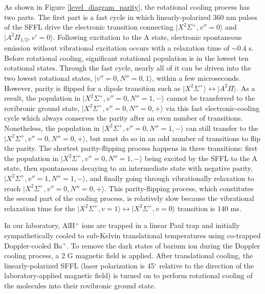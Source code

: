 \documentclass[nofootinbib,aip,jcp,reprint]{revtex4-1}
\begin{document}
As shown in Figure \ref{level_diagram_parity}, the rotational cooling process has two parts. The first part is a fast cycle in which linearly-polarized 360 nm pulses of the SFFL drive the electronic transition connecting $\lvert X^2\Sigma^+, v''=0\rangle$ and $\lvert A^{2}\Pi_{1/2}, v'=0\rangle$. Following excitation to the A state, electronic spontaneous emission without vibrational excitation occurs with a relaxation time of $\sim$0.4 {\micro}s.  Before rotational cooling, significant rotational population is in the lowest ten rotational states. Through the fast cycle, nearly all of it can be driven into the two lowest rotational states, $\lvert v''=0, N''=0,1\rangle$, within a few microseconds. However, parity is flipped for a dipole transition such as $\lvert X^2\Sigma^+\rangle \leftrightarrow \lvert A^2\Pi\rangle$. As a result, the population in $\lvert X^2\Sigma^+, v''=0, N''=1, -\rangle$ cannot be transferred to the rovibronic ground state, $\lvert X^2\Sigma^+, v''=0, N''=0, +\rangle$ via this fast electronic-cooling cycle which always conserves the parity after an even number of transitions. Nonetheless, the population in $\lvert X^2\Sigma^+, v''=0, N''=1, -\rangle$ can still transfer to the $\lvert X^2\Sigma^+, v''=0, N''=0, +\rangle$, but must do so in an odd number of transitions to flip the parity. The shortest parity-flipping process happens in three transitions: first the population in $\lvert X^2\Sigma^+, v''=0, N''=1, -\rangle$ being excited by the SFFL to the A state, then spontaneous decaying to an intermediate state with negative parity, $\lvert X^2\Sigma^+, v''=1, N''=1, -\rangle$, and finally going through vibrationally relaxation to reach $\lvert X^2\Sigma^+, v''=0, N''=0, +\rangle$. This parity-flipping process, which constitutes the second part of the cooling process, is relatively slow because the vibrational relaxation time for the $\lvert X^2\Sigma^+, v=1\rangle \leftrightarrow \lvert X^2\Sigma^+, v=0\rangle$ transition is 140 ms.\par

In our laboratory, AlH$^+$ ions are trapped in a linear Paul trap and initially sympathetically cooled to sub-Kelvin translational temperatures using co-trapped Doppler-cooled Ba$^+$. To remove the dark states of barium ion during the Doppler cooling process, a 2 G magnetic field is applied. After translational cooling, the linearly-polarized SFFL (laser polarization is 45$^{\circ}$ relative to the direction of the laboratory-applied magnetic field) is turned on to perform rotational cooling of the molecules into their rovibronic ground state.\par
\end{document}
